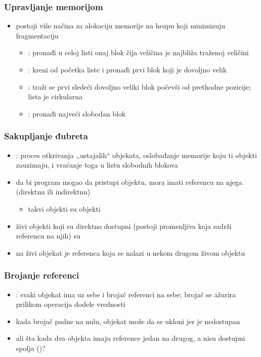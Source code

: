 \documentclass[compress,aspectratio=169]{beamer}
\begin{document}
\begin{frame}[fragile]
  \frametitle{Upravljanje memorijom}
  \begin{itemize}
    \item postoji više načina za alokaciju memorije na heapu koji 
    minimizuju fragmentaciju
    \begin{itemize}
      \item {}: pronađi u celoj listi onaj blok čija 
      veličina je najbliža traženoj veličini 
      \item {}: kreni od početka liste i pronađi prvi
      blok koji je dovoljno velik
      \item {}: traži se prvi sledeći dovoljno veliki blok
      počevši od prethodne pozicije; lista je cirkularna
      \item {}: pronađi najveći slobodan blok
    \end{itemize}
  \end{itemize}
\end{frame}

\begin{frame}[fragile]
  \frametitle{Sakupljanje đubreta}
  \begin{itemize}
    \item {}: proces otkrivanja ,,ustajalih`` 
    objekata, oslobađanje memorije koju ti objekti zauzimaju, i vraćanje 
    toga u listu slobodnih blokova
    \item da bi program mogao da pristupi objektu, mora imati referencu
    na njega (direktnu ili indirektnu)
    \begin{itemize}
      \item takvi objekti su  objekti
    \end{itemize}
    \item živi objekti koji su direktno dostupni (postoji promenljiva
    koja sadrži referencu na njih) su 
    \item {} na živi objekat je referenca koja
    se nalazi u nekom drugom živom objektu
  \end{itemize}
\end{frame}

\begin{frame}[fragile]
  \frametitle{Brojanje referenci}
  \begin{itemize}
    \item {}: svaki objekat ima uz sebe i brojač
      referenci na sebe; brojač se ažurira prilikom operacija dodele
      vrednosti
    \item kada brojač padne na nulu, objekat može da se ukloni jer je
      nedostupan
    \item ali šta kada dva objekta imaju reference jedan na drugog, a
      nisu dostupni spolja ()?
  \end{itemize}
\end{frame}
\end{document}

